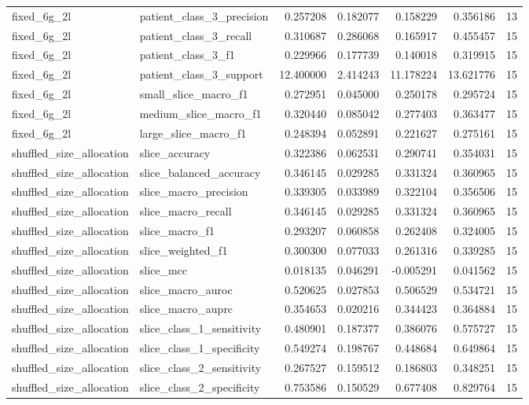 \begin{tabular}{llrrrrr}
fixed_6g_2l & patient_class_3_precision & 0.257208 & 0.182077 & 0.158229 & 0.356186 & 13 \\
fixed_6g_2l & patient_class_3_recall & 0.310687 & 0.286068 & 0.165917 & 0.455457 & 15 \\
fixed_6g_2l & patient_class_3_f1 & 0.229966 & 0.177739 & 0.140018 & 0.319915 & 15 \\
fixed_6g_2l & patient_class_3_support & 12.400000 & 2.414243 & 11.178224 & 13.621776 & 15 \\
fixed_6g_2l & small_slice_macro_f1 & 0.272951 & 0.045000 & 0.250178 & 0.295724 & 15 \\
fixed_6g_2l & medium_slice_macro_f1 & 0.320440 & 0.085042 & 0.277403 & 0.363477 & 15 \\
fixed_6g_2l & large_slice_macro_f1 & 0.248394 & 0.052891 & 0.221627 & 0.275161 & 15 \\
shuffled_size_allocation & slice_accuracy & 0.322386 & 0.062531 & 0.290741 & 0.354031 & 15 \\
shuffled_size_allocation & slice_balanced_accuracy & 0.346145 & 0.029285 & 0.331324 & 0.360965 & 15 \\
shuffled_size_allocation & slice_macro_precision & 0.339305 & 0.033989 & 0.322104 & 0.356506 & 15 \\
shuffled_size_allocation & slice_macro_recall & 0.346145 & 0.029285 & 0.331324 & 0.360965 & 15 \\
shuffled_size_allocation & slice_macro_f1 & 0.293207 & 0.060858 & 0.262408 & 0.324005 & 15 \\
shuffled_size_allocation & slice_weighted_f1 & 0.300300 & 0.077033 & 0.261316 & 0.339285 & 15 \\
shuffled_size_allocation & slice_mcc & 0.018135 & 0.046291 & -0.005291 & 0.041562 & 15 \\
shuffled_size_allocation & slice_macro_auroc & 0.520625 & 0.027853 & 0.506529 & 0.534721 & 15 \\
shuffled_size_allocation & slice_macro_auprc & 0.354653 & 0.020216 & 0.344423 & 0.364884 & 15 \\
shuffled_size_allocation & slice_class_1_sensitivity & 0.480901 & 0.187377 & 0.386076 & 0.575727 & 15 \\
shuffled_size_allocation & slice_class_1_specificity & 0.549274 & 0.198767 & 0.448684 & 0.649864 & 15 \\
shuffled_size_allocation & slice_class_2_sensitivity & 0.267527 & 0.159512 & 0.186803 & 0.348251 & 15 \\
shuffled_size_allocation & slice_class_2_specificity & 0.753586 & 0.150529 & 0.677408 & 0.829764 & 15 \\

\end{tabular}
